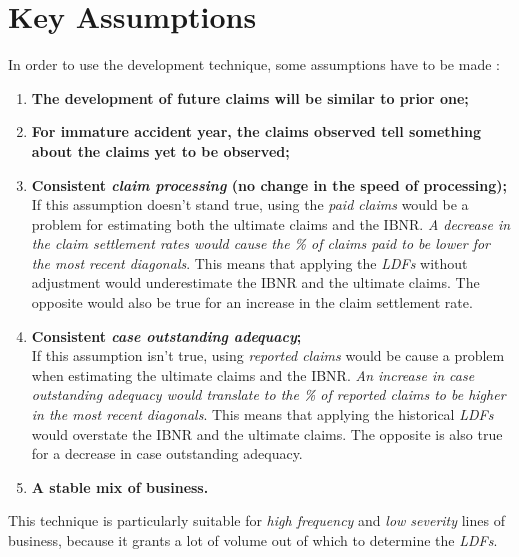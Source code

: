 \documentclass[11pt, english]{memoir}
\numberwithin{definition}{section}
\begin{document}
\section{Key Assumptions}
In order to use the development technique, some assumptions have to be made :
\begin{enumerate}
	\item \textbf{The development of future claims will be similar to prior one;}\\
	\item \textbf{For immature accident year, the claims observed tell something about the claims yet to be observed;}\\
	\item \textbf{Consistent \emph{claim processing} (no change in the speed of processing);}\\
	If this assumption doesn't stand true, using the \emph{paid claims} would be a problem for estimating both the ultimate claims and the IBNR.\emph{ A decrease in the claim settlement rates would cause the \% of claims paid to be lower for the most recent diagonals}. This means that applying the \emph{LDFs} without adjustment would underestimate the IBNR and the ultimate claims. The opposite would also be true for an increase in the claim settlement rate. \\
	\item \textbf{Consistent \emph{case outstanding adequacy};}\\
	If this assumption isn't true, using \emph{reported claims} would be cause a problem when estimating the ultimate claims and the IBNR. \emph{An increase in case outstanding adequacy would translate to the \% of reported claims to be higher in the most recent diagonals}. This means that applying the historical \emph{LDFs} would overstate the IBNR and the ultimate claims. The opposite is also true for a decrease in case outstanding adequacy. \\
	
	\item \textbf{A stable mix of business.}
\end{enumerate}

This technique is particularly suitable for \emph{high frequency} and \emph{low severity} lines of business, because it grants a lot of volume out of which to determine the \emph{LDFs}. 
\end{document}
